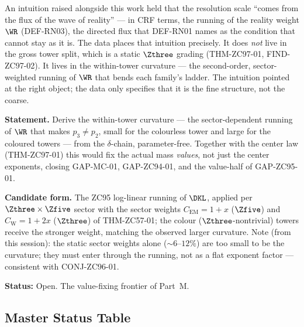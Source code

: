 \documentclass[12pt, a4paper]{article}
\begin{document}
\begin{genealogybox}[title={Where an independent intuition correctly landed}]
An intuition raised alongside this work held that the resolution scale ``comes
from the flux of the wave of reality'' --- in CRF terms, the running of the
reality weight $\WR$ (DEF-RN03), the directed flux that DEF-RN01 names as the
condition that cannot stay as it is. The data places that intuition precisely.
It does \emph{not} live in the gross tower split, which is a static $\Zthree$
grading (THM-ZC97-01, FIND-ZC97-02). It lives in the within-tower curvature ---
the second-order, sector-weighted running of $\WR$ that bends each family's
ladder. The intuition pointed at the right object; the data only specifies that
it is the fine structure, not the coarse.
\end{genealogybox}

\begin{openqbox}[title={GAP-ZC97-01: The Sector-Weighted Curvature
  (Priority 1 --- handed to ZC98)}]
\textbf{Statement.} Derive the within-tower curvature --- the sector-dependent
running of $\WR$ that makes $p_3\neq p_2$, small for the colourless tower and
large for the coloured towers --- from the $\delta$-chain, parameter-free.
Together with the center law (THM-ZC97-01) this would fix the actual mass
\emph{values}, not just the center exponents, closing GAP-MC-01, GAP-ZC94-01,
and the value-half of GAP-ZC95-01.

\textbf{Candidate form.} The ZC95 log-linear running of $\DKL$, applied per
$\Zthree\times\Zfive$ sector with the sector weights $C_{\mathrm{EM}}=1+x$
($\Zfive$) and $C_{\mathrm{W}}=1+2x$ ($\Zthree$) of THM-ZC57-01; the colour
($\Zthree$-nontrivial) towers receive the stronger weight, matching the observed
larger curvature. Note (from this session): the static sector weights alone
($\sim6$--$12\%$) are too small to be the curvature; they must enter through the
running, not as a flat exponent factor --- consistent with CONJ-ZC96-01.

\textbf{Status:} Open. The value-fixing frontier of Part~M.
\end{openqbox}

\subsection{Master Status Table}
\end{document}
